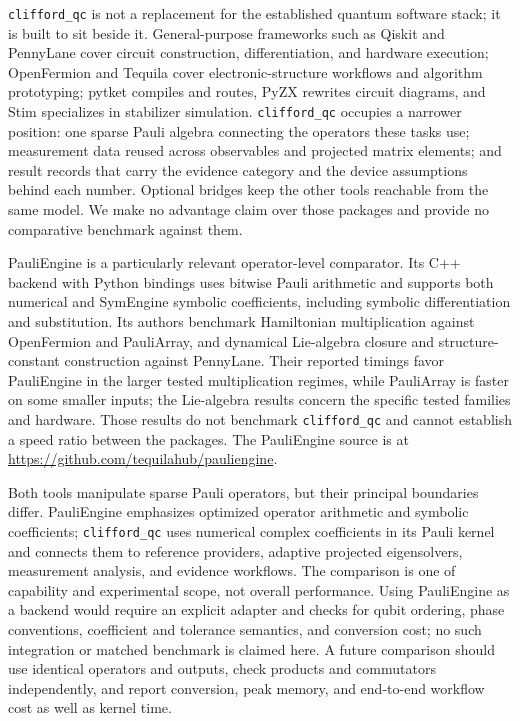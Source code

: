 \documentclass[aps,pra,reprint,superscriptaddress,nofootinbib,floatfix,
  showkeys]{revtex4-2}
\newcommand{\pkg}{\texttt{clifford\_qc}}
\begin{document}
\pkg{} is not a replacement for the established quantum software stack; it is
built to sit beside it. General-purpose frameworks such as Qiskit
\cite{javadiabhari2024qiskit} and PennyLane \cite{bergholm2018pennylane} cover
circuit construction, differentiation, and hardware execution; OpenFermion
\cite{mcclean2020openfermion} and Tequila \cite{kottmann2021tequila} cover
electronic-structure workflows and algorithm prototyping; pytket
\cite{sivarajah2020tket} compiles and routes, PyZX \cite{kissinger2020pyzx}
rewrites circuit diagrams, and Stim \cite{gidney2021stim} specializes in
stabilizer simulation. \pkg{} occupies a narrower position: one sparse Pauli
algebra connecting the operators these tasks use; measurement data
reused across observables and projected matrix elements; and result records
that carry the evidence category and the device assumptions behind each number.
Optional bridges keep the other tools reachable from the same model. We make no
advantage claim over those packages and provide no comparative benchmark
against them.

PauliEngine \cite{muller2026pauliengine} is a particularly relevant
operator-level comparator. Its C++ backend with Python bindings uses bitwise
Pauli arithmetic and supports both numerical and SymEngine symbolic coefficients,
including symbolic differentiation and substitution. Its authors benchmark
Hamiltonian multiplication against OpenFermion and PauliArray, and dynamical
Lie-algebra closure and structure-constant construction against PennyLane.
Their reported timings favor PauliEngine in the larger tested multiplication
regimes, while PauliArray is faster on some smaller inputs; the Lie-algebra
results concern the specific tested families and hardware. Those results do not
benchmark \pkg{} and cannot establish a speed ratio between the packages.
The PauliEngine source is at \url{https://github.com/tequilahub/pauliengine}.

Both tools manipulate sparse Pauli operators, but their principal boundaries
differ. PauliEngine emphasizes optimized operator arithmetic and symbolic
coefficients; \pkg{} uses numerical complex coefficients in its Pauli kernel
and connects them to reference providers, adaptive projected eigensolvers,
measurement analysis, and evidence workflows. The comparison is one of
capability and experimental scope, not overall performance. Using PauliEngine
as a backend would require an explicit adapter and checks for qubit ordering,
phase conventions, coefficient and tolerance semantics, and conversion cost;
no such integration or matched benchmark is claimed here. A future comparison
should use identical operators and outputs, check products and commutators
independently, and report conversion, peak memory, and end-to-end workflow cost
as well as kernel time.
\end{document}
